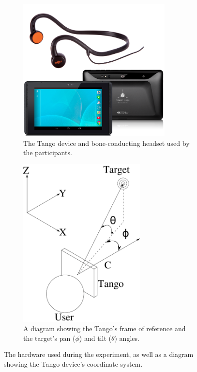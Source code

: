 \documentclass[sigconf, review=true, screen=true, anonymous=true]{acmart}
\begin{document}
\begin{figure}
  \centering
  \begin{subfigure}[t]{0.45\textwidth}
    \centering
    \includegraphics[width=0.85\textwidth]{figures/tango_headphone.png}
    \caption{The Tango device and bone-conducting headset used by the participants. }
    \label{fig:tango-headphone}
  \end{subfigure}\hfill
  \begin{subfigure}[t]{0.45\textwidth}
    \centering
    \includegraphics[width=0.7\textwidth]{figures/camera_coordinate.pdf}
    \caption{A diagram showing the Tango's frame of reference and the target's pan ($\phi$) and tilt ($\theta$) angles.}
    \label{fig:cam-coords}
  \end{subfigure}
  \caption{The hardware used during the experiment, as well as a diagram showing the Tango device's coordinate system. }
\end{figure}
\end{document}
